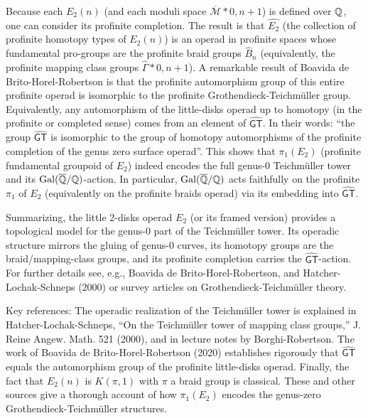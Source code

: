 Because each $E_2(n)$ (and each moduli space $\overline{\mathcal{M}}*{0,n+1}$) is defined over $\mathbb{Q}$, one can consider its profinite completion.  The result is that $\widehat{E_2}$ (the collection of profinite homotopy types of $E_2(n)$) is an operad in profinite spaces whose fundamental pro-groups are the profinite braid groups $\widehat B_n$ (equivalently, the profinite mapping class groups $\widehat\Gamma*{0,n+1}$).  A remarkable result of Boavida de Brito-Horel-Robertson is that the profinite automorphism group of this entire profinite operad is isomorphic to the profinite Grothendieck-Teichm\"uller group.  Equivalently, any automorphism of the little-disks operad up to homotopy (in the profinite or completed sense) comes from an element of $\widehat{\mathsf{GT}}$.  In their words: “the group $\widehat{\mathsf{GT}}$ is isomorphic to the group of homotopy automorphisms of the profinite completion of the genus zero surface operad”.  This shows that $\pi_1(E_2)$ (profinite fundamental groupoid of $E_2$) indeed encodes the full genus-0 Teichm\"uller tower and its $\mathrm{Gal}(\overline{\mathbb{Q}}/\mathbb{Q})$-action.  In particular, $\mathrm{Gal}(\overline{\mathbb{Q}}/\mathbb{Q})$ acts faithfully on the profinite $\pi_1$ of $E_2$ (equivalently on the profinite braids operad) via its embedding into $\widehat{\mathsf{GT}}$.

Summarizing, the little 2-disks operad $E_2$ (or its framed version) provides a topological model for the genus-0 part of the Teichm\"uller tower.  Its operadic structure mirrors the gluing of genus-0 curves, its homotopy groups are the braid/mapping-class groups, and its profinite completion carries the $\widehat{\mathsf{GT}}$-action.  For further details see, e.g., Boavida de Brito-Horel-Robertson, and Hatcher-Lochak-Schneps (2000) or survey articles on Grothendieck-Teichm\"uller theory.

Key references: The operadic realization of the Teichm\"uller tower is explained in Hatcher-Lochak-Schneps, “On the Teichm\"uller tower of mapping class groups,” J. Reine Angew. Math. 521 (2000), and in lecture notes by Borghi-Robertson.  The work of Boavida de Brito-Horel-Robertson (2020) establishes rigorously that $\widehat{\mathsf{GT}}$ equals the automorphism group of the profinite little-disks operad.  Finally, the fact that $E_2(n)$ is $K(\pi,1)$ with $\pi$ a braid group is classical.  These and other sources give a thorough account of how $\pi_1(E_2)$ encodes the genus-zero Grothendieck-Teichm\"uller structures. 
